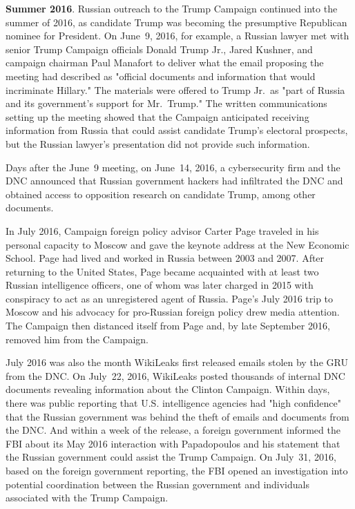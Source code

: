 \textbf{Summer 2016}.
Russian outreach to the Trump Campaign continued into the summer of 2016, as candidate Trump was becoming the presumptive Republican nominee for President.
On June~9, 2016, for example, a Russian lawyer met with senior Trump Campaign officials Donald Trump Jr., Jared Kushner, and campaign chairman Paul Manafort to deliver what the email proposing the meeting had described as "official documents and information that would incriminate Hillary."
The materials were offered to Trump Jr.\ as "part of Russia and its government's support for Mr.~Trump."
The written communications setting up the meeting showed that the Campaign anticipated receiving information from Russia that could assist candidate Trump's electoral prospects, but the Russian lawyer's presentation did not provide such information.

Days after the June~9 meeting, on June~14, 2016, a cybersecurity firm and the DNC announced that Russian government hackers had infiltrated the DNC and obtained access to opposition research on candidate Trump, among other documents.

In July 2016, Campaign foreign policy advisor Carter Page traveled in his personal capacity to Moscow and gave the keynote address at the New Economic School.
Page had lived and worked in Russia between 2003 and 2007.
After returning to the United States, Page became acquainted with at least two Russian intelligence officers, one of whom was later charged in 2015 with conspiracy to act as an unregistered agent of Russia.
Page's July 2016 trip to Moscow and his advocacy for pro-Russian foreign policy drew media attention.
The Campaign then distanced itself from Page and, by late September 2016, removed him from the Campaign.

July 2016 was also the month WikiLeaks first released emails stolen by the GRU from the DNC\null.
On July~22, 2016, WikiLeaks posted thousands of internal DNC documents revealing information about the Clinton Campaign.
Within days, there was public reporting that U.S. intelligence agencies had "high confidence" that the Russian government was behind the theft of emails and documents from the DNC\null.
And within a week of the release, a foreign government informed the FBI about its May 2016 interaction with Papadopoulos and his statement that the Russian government could assist the Trump Campaign.
On July~31, 2016, based on the foreign government reporting, the FBI opened an investigation into potential coordination between the Russian government and individuals associated with the Trump Campaign.

